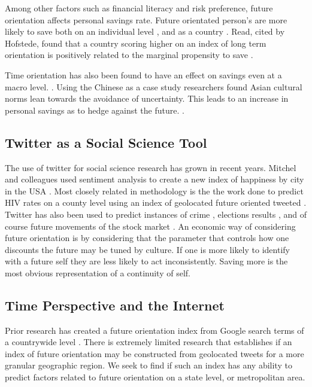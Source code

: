 \documentclass{article}
\begin{document}
Among other factors such as financial literacy and risk preference, future orientation affects personal savings rate. Future orientated person's are more likely to save both on an individual level \citep{jacobs2005influence}, and as a country \citep{hofstede1988confucius, hofstede1991cultures}. Read, cited by Hofstede, found that a country scoring higher on an index of long term orientation is positively related to the marginal propensity to save \cite{read1993politics}.


Time orientation has also been found to have an effect on savings even at a macro level. \cite{hofstede1988confucius}. Using the Chinese as a case study researchers found Asian cultural norms lean towards the avoidance of uncertainty. This leads to an increase in personal savings as to hedge against the future.  \citep{hofstede1988confucius}. 

\subsection{Twitter as a Social Science Tool}

The use of twitter for social science research has grown in recent years. Mitchel and colleagues used sentiment analysis to create a new index of happiness by city in the USA \citep{mitchell2013geography}. Most closely related in methodology is the the work done to predict HIV rates on a county level using an index of geolocated future oriented tweeted \citep{ireland2015future}. Twitter has also been used to predict instances of crime \citep{gerber2014predicting}, elections results \citep{tumasjan2011election}, and of course future movements of the stock market \citep{bollen2011twitter}. An economic way of considering future orientation is by considering that the parameter that controls how one discounts the future may be tuned by culture. If one is more likely to identify with a future self they are less likely to act inconsistently. Saving more is the most obvious representation of a continuity of self.   


\subsection{Time Perspective and the Internet}

Prior research has created a future orientation index from Google search terms of a countrywide level \citep{preis2012quantifying}. There is extremely limited research that establishes if an index of future orientation may be constructed from geolocated tweets for a more granular geographic region. We seek to find if such an index has any ability to predict factors related to future orientation on a state level, or metropolitan area.
\end{document}
